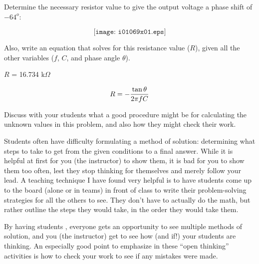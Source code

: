 

Determine the necessary resistor value to give the output voltage a phase shift of $-64^{o}$:

$$\texttt{[image: i01069x01.eps]}$$

Also, write an equation that solves for this resistance value ($R$), given all the other variables ($f$, $C$, and phase angle $\theta$).







$R$ = 16.734 k$\Omega$

$$R = -{{\tan \theta} \over {2 \pi f C}}$$







Discuss with your students what a good procedure might be for calculating the unknown values in this problem, and also how they might check their work.

\vskip 10pt

Students often have difficulty formulating a method of solution: determining what steps to take to get from the given conditions to a final answer.  While it is helpful at first for you (the instructor) to show them, it is bad for you to show them too often, lest they stop thinking for themselves and merely follow your lead.  A teaching technique I have found very helpful is to have students come up to the board (alone or in teams) in front of class to write their problem-solving strategies for all the others to see.  They don't have to actually do the math, but rather outline the steps they would take, in the order they would take them.

By having students , everyone gets an opportunity to see multiple methods of solution, and you (the instructor) get to see how (and if!) your students are thinking.  An especially good point to emphasize in these ``open thinking'' activities is how to check your work to see if any mistakes were made.




